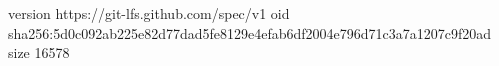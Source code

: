 version https://git-lfs.github.com/spec/v1
oid sha256:5d0c092ab225e82d77dad5fe8129e4efab6df2004e796d71c3a7a1207c9f20ad
size 16578
